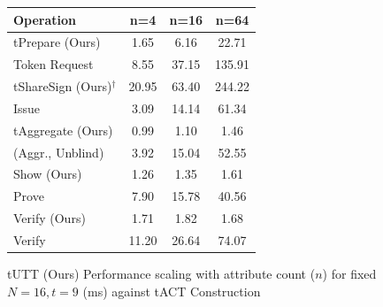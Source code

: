 \begin{figure}[!htb]
    \centering
    \begin{minipage}[t]{0.48\textwidth}
        \centering
        
        \vspace{0.5em}
        \scriptsize
        \begin{tabular}{lccc}
        \toprule
        \textbf{Operation} & \textbf{n=4} & \textbf{n=16} & \textbf{n=64} \\
        \midrule
        tPrepare (Ours) & 1.65 & 6.16 & 22.71 \\
        Token Request & 8.55 & 37.15 & 135.91 \\
        \midrule
        tShareSign (Ours)$^{\dagger}$ & 20.95 & 63.40 & 244.22 \\
        Issue & 3.09 & 14.14 & 61.34 \\
        \midrule
        tAggregate (Ours) & 0.99 & 1.10 & 1.46 \\
        (Aggr., Unblind) & 3.92 & 15.04 & 52.55 \\
        \midrule
        Show (Ours) & 1.26 & 1.35 & 1.61 \\
        Prove & 7.90 & 15.78 & 40.56 \\
        \midrule
        Verify (Ours) & 1.71 & 1.82 & 1.68 \\
        Verify & 11.20 & 26.64 & 74.07 \\
        \bottomrule
        \end{tabular}
        \caption{tUTT (Ours) Performance scaling with attribute count ($n$) for fixed $N=16, t=9$ (ms) against tACT Construction}
        \label{tab:chap5_n_scaling_combined_utt_act}
    \end{minipage}
    \hfill
    \begin{minipage}[t]{0.48\textwidth}
        \centering
        

\end{minipage}
\end{figure}
